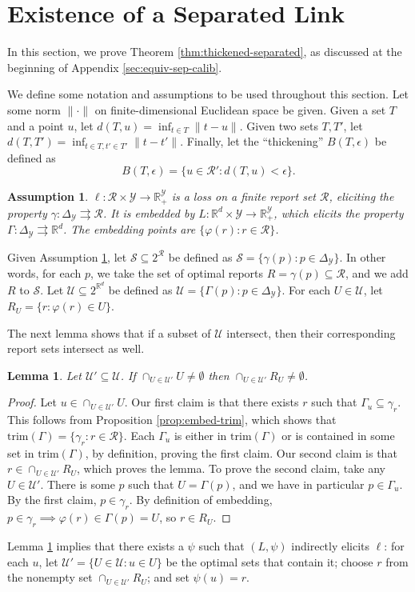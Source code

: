 \documentclass[11pt]{article}
\newcommand{\reals}{\mathbb{R}}
\newcommand{\simplex}{\Delta_\Y}
\newcommand{\R}{\mathcal{R}}
\newcommand{\U}{\mathcal{U}}
\newcommand{\Y}{\mathcal{Y}}
\newcommand{\toto}{\rightrightarrows}
\newcommand{\trim}{\mathrm{trim}}
\newtheorem{lemma}{Lemma}
\newtheorem{assumption}{Assumption}
\begin{document}
\section{Existence of a Separated Link} \label{app:sep-link-exists}
In this section, we prove Theorem \ref{thm:thickened-separated}, as discussed at the beginning of Appendix \ref{sec:equiv-sep-calib}.

We define some notation and assumptions to be used throughout this section.
Let some norm $\|\cdot\|$ on finite-dimensional Euclidean space be given.
Given a set $T$ and a point $u$, let $d(T,u) = \inf_{t \in T} \|t-u\|$.
Given two sets $T,T'$, let $d(T,T') = \inf_{t\in T, t' \in T'} \|t-t'\|$.
Finally, let the ``thickening'' $B(T,\epsilon)$ be defined as
  \[ B(T,\epsilon) = \{u \in \R' : d(T,u) < \epsilon \} . \]

\begin{assumption} \label{assume:cal}
  $\ell: \R \times \Y \to \reals^{\Y}_+$ is a loss on a finite report set $\R$, eliciting the property $\gamma: \simplex \toto \R$.
  It is embedded by $L: \reals^d \times \Y \to \reals^{\Y}_+$, which elicits the property $\Gamma: \simplex \toto \reals^d$.
  The embedding points are $\{\varphi(r) : r \in \R\}$.
\end{assumption}

Given Assumption \ref{assume:cal}, let $\mathcal{S} \subseteq 2^{\R}$ be defined as $\mathcal{S} = \{\gamma(p) : p \in \Delta_{\Y}\}$.
In other words, for each $p$, we take the set of optimal reports $R = \gamma(p) \subseteq \R$, and we add $R$ to $\mathcal{S}$.
Let $\U \subseteq 2^{\reals^d}$ be defined as $\U = \{\Gamma(p) : p \in \Delta_{\Y}\}$.
For each $U \in \U$, let $R_U = \{r: \varphi(r) \in U\}$.

The next lemma shows that if a subset of $\U$ intersect, then their corresponding report sets intersect as well.
\begin{lemma} \label{lemma:calibrated-pos}
  Let $\U' \subseteq \U$.
  If $\cap_{U\in\U'} U \neq \emptyset$ then $\cap_{U\in\U'} R_U \neq \emptyset$.
\end{lemma}
\begin{proof}
  Let $u \in \cap_{U\in\U'} U$.
  Our first claim is that there exists $r$ such that $\Gamma_u \subseteq \gamma_r$.
  This follows from Proposition \ref{prop:embed-trim}, which shows that $\trim(\Gamma) = \{ \gamma_r : r \in \R\}$.
  Each $\Gamma_u$ is either in $\trim(\Gamma)$ or is contained in some set in $\trim(\Gamma)$, by definition, proving the first claim.
  Our second claim is that $r \in \cap_{U\in\U'} R_U$, which proves the lemma.
  To prove the second claim, take any $U \in \U'$.
  There is some $p$ such that $U = \Gamma(p)$, and we have in particular $p \in \Gamma_u$.
  By the first claim, $p \in \gamma_r$.
  By definition of embedding, $p \in \gamma_r \implies \varphi(r) \in \Gamma(p) = U$, so $r \in R_U$.
\end{proof}
Lemma \ref{lemma:calibrated-pos} implies that there exists a $\psi$ such that $(L,\psi)$ indirectly elicits $\ell$: for each $u$, let $\U' = \{U\in\U : u \in U\}$ be the optimal sets that contain it; choose $r$ from the nonempty set $\cap_{U \in\U'} R_U$; and set $\psi(u) = r$.
\end{document}
